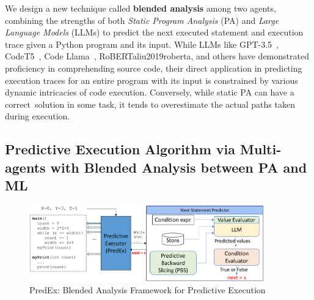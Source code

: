 
We design a new technique called {\bf blended analysis} among two
agents, combining the strengths of both {\em Static Program Analysis}
(PA) and {\em Large Language Models} (LLMs) to predict the next
executed statement and execution trace given a Python program and its
input. While LLMs like GPT-3.5~\cite{GPT3.5},
CodeT5~\cite{wang2023codet5}, Code Llama~\cite{code_llama},
RoBERTa{liu2019roberta}, and others have demonstrated proficiency in
comprehending source code, their direct application in predicting
execution traces for an entire program with its input is constrained
by various dynamic intricacies of code execution. Conversely, while
static PA can have a correct~solution in some task, it tends to
overestimate the actual paths taken during execution.

\subsection{Predictive Execution Algorithm via Multi-agents with Blended Analysis between PA and ML}

\begin{figure}
\begin{center}
\includegraphics[width=4in]{overview-4.png}
\vspace{-22pt}
\caption{PredEx: Blended Analysis Framework for Predictive Execution}
\label{fig:overview}
\end{center}
\end{figure}

